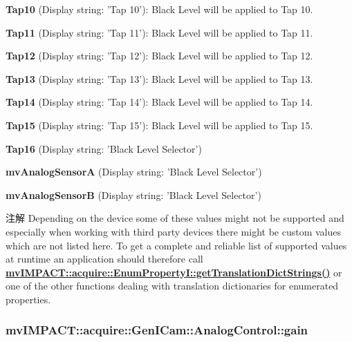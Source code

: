 \begin{DoxyItemize}
\item {\bfseries Tap10} (Display string\+: 'Tap 10')\+: Black Level will be applied to Tap 10.
\item {\bfseries Tap11} (Display string\+: 'Tap 11')\+: Black Level will be applied to Tap 11.
\item {\bfseries Tap12} (Display string\+: 'Tap 12')\+: Black Level will be applied to Tap 12.
\item {\bfseries Tap13} (Display string\+: 'Tap 13')\+: Black Level will be applied to Tap 13.
\item {\bfseries Tap14} (Display string\+: 'Tap 14')\+: Black Level will be applied to Tap 14.
\item {\bfseries Tap15} (Display string\+: 'Tap 15')\+: Black Level will be applied to Tap 15.
\item {\bfseries Tap16} (Display string\+: 'Black Level Selector')
\item {\bfseries mv\+Analog\+Sensor\+A} (Display string\+: 'Black Level Selector')
\item {\bfseries mv\+Analog\+Sensor\+B} (Display string\+: 'Black Level Selector')
\end{DoxyItemize}

\begin{DoxyNote}{注解}
Depending on the device some of these values might not be supported and especially when working with third party devices there might be custom values which are not listed here. To get a complete and reliable list of supported values at runtime an application should therefore call {\bfseries \hyperlink{classmv_i_m_p_a_c_t_1_1acquire_1_1_enum_property_i_a0ba6ccbf5ee69784d5d0b537924d26b6}{mv\+I\+M\+P\+A\+C\+T\+::acquire\+::\+Enum\+Property\+I\+::get\+Translation\+Dict\+Strings()}} or one of the other functions dealing with translation dictionaries for enumerated properties. 
\end{DoxyNote}
\hypertarget{classmv_i_m_p_a_c_t_1_1acquire_1_1_gen_i_cam_1_1_analog_control_abe8ee050e6f59ab940cdd1c3e6ddafae}{
\subsubsection[{gain}]{ mv\+I\+M\+P\+A\+C\+T\+::acquire\+::\+Gen\+I\+Cam\+::\+Analog\+Control\+::gain}}\label{classmv_i_m_p_a_c_t_1_1acquire_1_1_gen_i_cam_1_1_analog_control_abe8ee050e6f59ab940cdd1c3e6ddafae}


